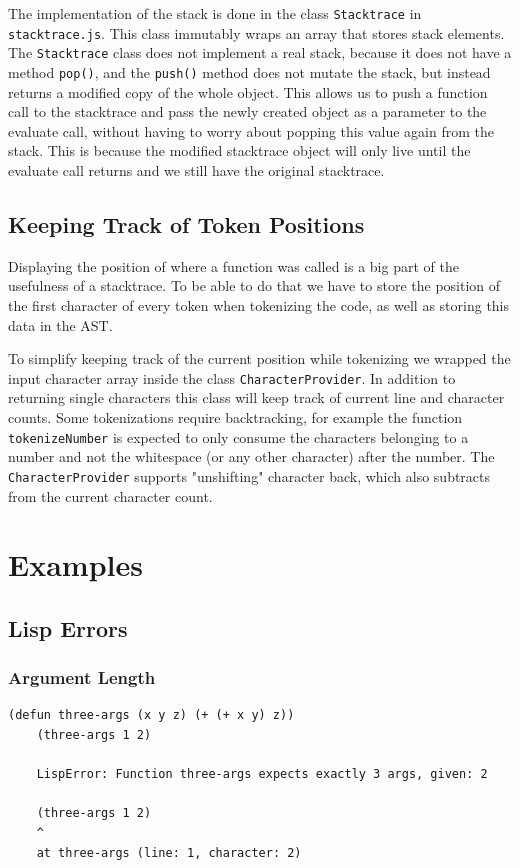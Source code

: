 \documentclass[a4paper,titlepage]{article}
\numberwithin{equation}{section} %
\begin{document}
	The implementation of the stack is done in the class \texttt{Stacktrace} in \texttt{stacktrace.js}. This class immutably wraps an array that stores stack elements. The \texttt{Stacktrace} class does not implement a real stack, because it does not have a method \texttt{pop()}, and the \texttt{push()} method does not mutate the stack, but instead returns a modified copy of the whole object.
	This allows us to push a function call to the stacktrace and pass the newly created object as a parameter to the evaluate call, without having to worry about popping this value again from the stack. This is because the modified stacktrace object will only live until the evaluate call returns and we still have the original stacktrace.
	
	\subsection{Keeping Track of Token Positions}
	\label{sub-token-pos}
	Displaying the position of where a function was called is a big part of the usefulness of a stacktrace. To be able to do that we have to store the position of the first character of every token when tokenizing the code, as well as storing this data in the AST.
	
	To simplify keeping track of the current position while tokenizing we wrapped the input character array inside the class \texttt{CharacterProvider}. In addition to returning single characters this class will keep track of current line and character counts. Some tokenizations require backtracking, for example the function \texttt{tokenizeNumber} is expected to only consume the characters belonging to a number and not the whitespace (or any other character) after the number. The \texttt{CharacterProvider} supports "unshifting" character back, which also subtracts from the current character count.
	
	\newpage
	\section{Examples}
	
	\subsection{Lisp Errors}
	
	\subsubsection{Argument Length}
	\begin{lstlisting}[]
	(defun three-args (x y z) (+ (+ x y) z))
	(three-args 1 2)
	
	LispError: Function three-args expects exactly 3 args, given: 2
	
	(three-args 1 2)
	^
	at three-args (line: 1, character: 2)
	\end{lstlisting}
	\vspace{1cm}
\end{document}
